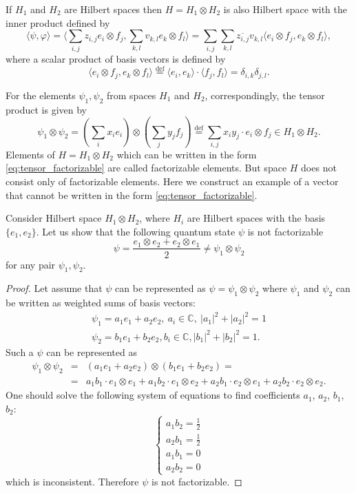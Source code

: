 \documentclass[11pt]{article}
\begin{document}
If $H_1$ and $H_2$ are Hilbert spaces then $H = H_1\otimes H_2$ is also Hilbert space with the inner product defined by
\[
\langle\psi, \varphi\rangle = \langle \sum_{i,j}z_{i,j}e_i\otimes f_j, \sum_{k,l}v_{k,l}e_k\otimes f_l \rangle = \sum_{i, j}\sum_{k, l}\overline{z_{i,j}}v_{k,l} \langle e_i\otimes f_j, e_k\otimes f_l \rangle,
\]
where a scalar product of basis vectors is defined by
\[
\langle e_i\otimes f_j, e_k\otimes f_l \rangle \overset{\mbox{def}}= \langle e_i, e_k\rangle \cdot \langle f_j, f_l \rangle = \delta_{i, k}\delta_{j, l}.
\]

For the elements $\psi_1, \psi_2$ from spaces $H_1$ and $H_2$, correspondingly, the tensor product is given by
\begin{equation}
\psi_1 \otimes \psi_2 = \left(\sum_ix_ie_i\right) \otimes \left(\sum_jy_jf_j\right) \overset{\mbox{def}}= \sum_{i, j} x_iy_j \cdot e_i \otimes f_j \in H_1 \otimes H_2.
\label{eq:tensor_factorizable}
\end{equation}
Elements of $H = H_1\otimes H_2$ which can be written in the form \eqref{eq:tensor_factorizable} are called factorizable elements. But space $H$ does not consist only of factorizable elements. Here we construct an example of a vector that cannot be written in the form  \eqref{eq:tensor_factorizable}.

Consider Hilbert space $H_1\otimes H_2$, where $H_i$ are Hilbert spaces with the basis $\{e_1, e_2\}$. Let us show that the following quantum state $\psi$ is not factorizable
\[
	\psi = \frac{e_1 \otimes e_2 + e_2 \otimes e_1}{2} \ne \psi_1 \otimes \psi_2
\]
for any pair $\psi_1, \psi_2$.
\begin{proof}
Let assume that $\psi$ can be represented as $\psi = \psi_1\otimes\psi_2$ where
$\psi_1$ and $\psi_2$ can be written as weighted sums of basis vectors:
\begin{gather*}
	\psi_1 = a_1 e_1 + a_2 e_2,\ a_i\in \mathbb{C},\ |a_1|^2 + |a_2|^2 = 1 \\
	\psi_2 = b_1 e_1 + b_2 e_2, b_i\in \mathbb{C}, |b_1|^2 + |b_2|^2 = 1.
\end{gather*}
Such a $\psi$ can be represented as
\begin{eqnarray*}
	\psi_1 \otimes \psi_2 &=& (a_1 e_1 + a_2 e_2) \otimes (b_1 e_1 + b_2 e_2) = \\ &=&  
	a_1 b_1 \cdot e_1 \otimes e_1 + a_1 b_2 \cdot e_1 \otimes e_2 + 
	a_2 b_1 \cdot e_2 \otimes e_1 + a_2 b_2 \cdot e_2 \otimes e_2.
\end{eqnarray*}
One should solve the following system of equations to find coefficients $a_1$, $a_2$, $b_1$, $b_2$:
$$
\begin{cases}
a_1 b_2 = \frac12 \\
a_2 b_1 = \frac12 \\
a_1 b_1 = 0 \\
a_2 b_2 = 0
\end{cases}
$$
which is inconsistent. Therefore $\psi$ is not factorizable.
\end{proof}
 
\end{document}
